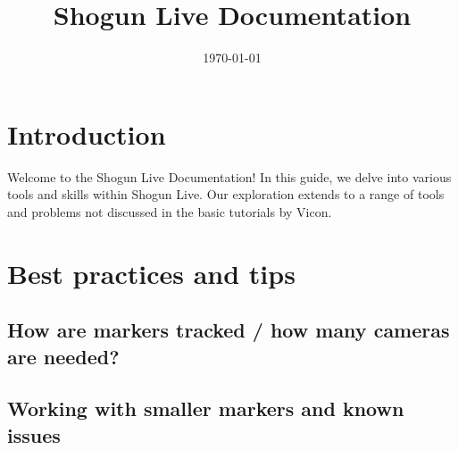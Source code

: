 \documentclass{uva-inf-article}
\title{Shogun Live Documentation}
\date{\today}
\begin{document}
\maketitle


\tableofcontents
\newpage
\section{Introduction}
Welcome to the Shogun Live Documentation! In this guide, we delve into various tools and skills within Shogun Live. Our exploration extends to a range of tools and problems not discussed in the basic tutorials by Vicon.

\section{Best practices and tips}
\subsection{How are markers tracked / how many cameras are needed?}

\subsection{Working with smaller markers and known issues}
\end{document}
